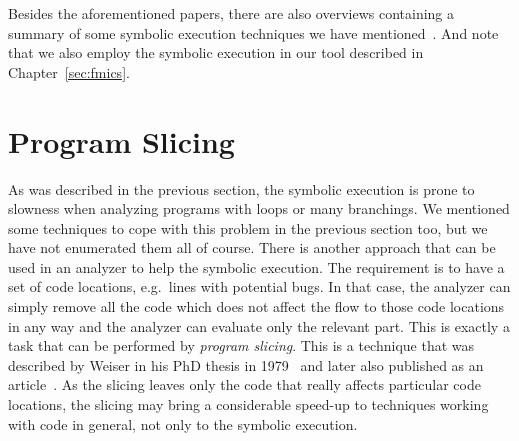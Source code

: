 Besides the aforementioned papers, there are also overviews containing a
summary of some symbolic execution techniques we have
mentioned~\cite{se_review88, se_review09, se_review10, se_review13}. And note
that we also employ the symbolic execution in our tool described in
Chapter~\ref{sec:fmics}.




\section{Program Slicing}\label{sec:slicing}
As was described in the previous section, the symbolic execution is prone to
slowness when analyzing programs with loops or many branchings. We mentioned
some techniques to cope with this problem in the previous section too, but we
have not enumerated them all of course. There is another approach that can be
used in an analyzer to help the symbolic execution. The requirement is to have
a set of code locations, e.g.\ lines with potential bugs. In that case, the
analyzer can simply remove all the code which does not affect the flow to
those code locations in any way and the analyzer can evaluate only the
relevant part.  This is exactly a task that can be performed by \emph{program
slicing}.  This is a technique that was described by Weiser in his PhD thesis
in 1979~\cite{slicing_phd} and later also published as an
article~\cite{slicing}.  As the slicing leaves only the code that really
affects particular code locations, the slicing may bring a considerable
speed-up to techniques working with code in general, not only to the symbolic
execution.

\newcommand{\newsym}[1]{\ensuremath\boldsymbol{\mathsf{#1}}}


